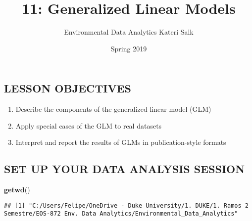 \documentclass[]{article}
\title{11: Generalized Linear Models}
\author{Environmental Data Analytics \textbar{} Kateri Salk}
\date{Spring 2019}
\newenvironment{Shaded}{\begin{snugshade}}{\end{snugshade}}
\newcommand{\KeywordTok}[1]{\textcolor[rgb]{0.13,0.29,0.53}{\textbf{#1}}}
\newcommand{\NormalTok}[1]{#1}
\providecommand{\tightlist}{%
  \setlength{\itemsep}{0pt}\setlength{\parskip}{0pt}}
\begin{document}
\maketitle

\subsection{LESSON OBJECTIVES}\label{lesson-objectives}

\begin{enumerate}
\def\labelenumi{\arabic{enumi}.}
\tightlist
\item
  Describe the components of the generalized linear model (GLM)
\item
  Apply special cases of the GLM to real datasets
\item
  Interpret and report the results of GLMs in publication-style formats
\end{enumerate}

\subsection{SET UP YOUR DATA ANALYSIS
SESSION}\label{set-up-your-data-analysis-session}

\begin{Shaded}
\begin{Highlighting}[]
\KeywordTok{getwd}\NormalTok{()}
\end{Highlighting}
\end{Shaded}

\begin{verbatim}
## [1] "C:/Users/Felipe/OneDrive - Duke University/1. DUKE/1. Ramos 2 Semestre/EOS-872 Env. Data Analytics/Environmental_Data_Analytics"
\end{verbatim}
\end{document}
